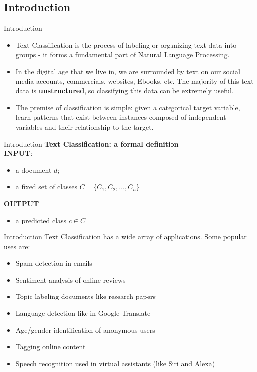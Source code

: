 \documentclass[11pt]{beamer}
\begin{document}
\subsection{Introduction \\ \scalebox{0.8}{What is Text Classification}}
\begin{frame}{Introduction}
	\begin{itemize}
		\item Text Classification is the process of labeling or organizing text data into groups - it forms a fundamental part of Natural Language Processing.
		\item In the digital age that we live in, we are surrounded by text on our social media accounts, commercials, websites, Ebooks, etc. The majority of this text data is \textbf{unstructured}, so classifying this data can be extremely useful.
		\item The premise of classification is simple: given a categorical target variable, learn patterns that exist between instances composed of independent variables and their relationship to the target. 
	\end{itemize}
\end{frame}
\begin{frame}{Introduction}
\textbf{Text Classification: a formal definition}\\
\vspace{0.5cm}
\textbf{INPUT}:
\begin{itemize}
\item a document $d$;
\item a fixed set of classes $C=\{C_1, C_2, \dots, C_n \}$
\end{itemize}
\vspace{0.5cm}
\textbf{OUTPUT}
\begin{itemize}
\item a predicted class $c \in C$
\end{itemize}
\end{frame}
\begin{frame}{Introduction}
	Text Classification has a wide array of applications. Some popular uses are:
	\begin{itemize}
		\item Spam detection in emails
		\item Sentiment analysis of online reviews
		\item Topic labeling documents like research papers
		\item Language detection like in Google Translate
		\item Age/gender identification of anonymous users
		\item Tagging online content
		\item Speech recognition used in virtual assistants (like Siri and Alexa)
	\end{itemize}
\end{frame}
\end{document}
